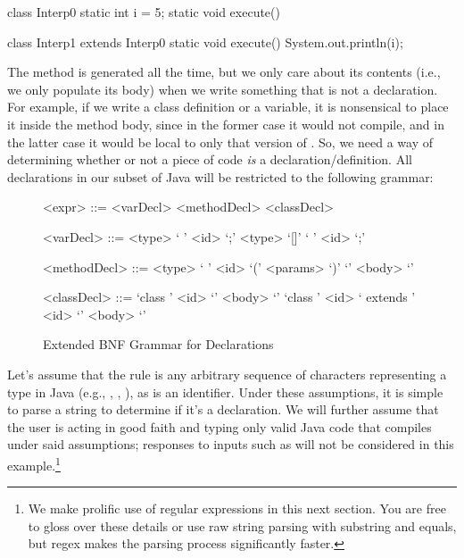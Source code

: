 \begin{verbnobox}[\small]
class Interp0 {
  static int i = 5;
  static void execute() {}
}

class Interp1 extends Interp0 {
  static void execute() {
    System.out.println(i);  
  }
}
\end{verbnobox}

The  method is generated all the time, but we only care about its contents (i.e., we only populate its body) when we write something that is not a declaration. For example, if we write a class definition or a variable, it is nonsensical to place it inside the  method body, since in the former case it would not compile, and in the latter case it would be local to only that version of . So, we need a way of determining whether or not a piece of code \emph{is} a declaration/definition. All declarations in our subset of Java will be restricted to the following grammar:

\setlength{\grammarparsep}{20pt plus 1pt minus 1pt} %
\setlength{\grammarindent}{12em} %
\begin{figure}[H]
        \begin{grammar}
            <expr> ::= <varDecl> 
                    \alt <methodDecl> 
                    \alt <classDecl>

            <varDecl> ::= <type> ` ' <id> `;'
                      \alt <type> `[]' ` ' <id> `;'

            <methodDecl> ::= <type> ` ' <id> `(' <params> `)' `{' <body> `}'

            <classDecl> ::= `class ' <id> `{' <body> `}'
                        \alt `class ' <id> ` extends ' <id> `{' <body> `}'

        \end{grammar}
    \caption{ Extended BNF Grammar for Declarations }
\end{figure}

Let's assume that the  rule is any arbitrary sequence of characters representing a type in Java (e.g., , , ), as is an identifier. Under these assumptions, it is simple to parse a string to determine if it's a declaration. We will further assume that the user is acting in good faith and typing only valid Java code that compiles under said assumptions; responses to inputs such as  will not be considered in this example.\footnote{We make prolific use of regular expressions in this next section. You are free to gloss over these details or use raw string parsing with substring and equals, but regex makes the parsing process significantly faster.}


